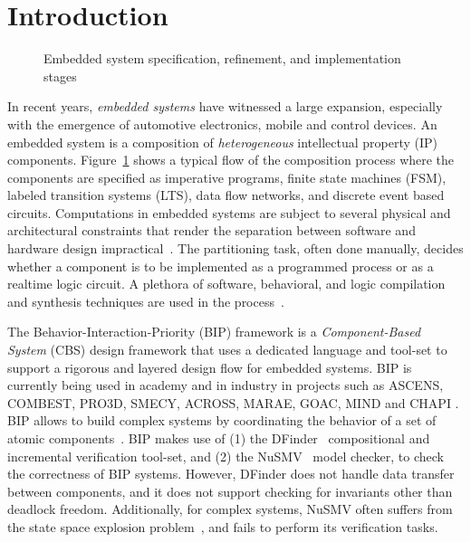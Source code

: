 \section{Introduction}
\label{sect-intro}

\begin{figure}
\resizebox{.9\columnwidth}{!}{
  
}
\caption{Embedded system specification, refinement, and implementation stages}
\label{fig:flow}
\end{figure}

In recent years, {\em embedded systems} have witnessed a large 
expansion, especially with  the emergence of automotive 
electronics, mobile and control devices.
An embedded system is a composition of {\em heterogeneous}
intellectual property (IP) components.
Figure~\ref{fig:flow} shows a typical flow of the composition process where the
components are specified as imperative programs, finite state machines (FSM), labeled 
transition systems (LTS), data flow networks, and discrete event based circuits. 
Computations in embedded systems are subject to several 
physical and architectural 
constraints that render the separation between software and 
hardware design impractical~\cite{henzinger2006embedded}.
The partitioning task, often done manually, decides whether a component is to 
be implemented as a programmed process or as a realtime logic circuit. 
A plethora of software, behavioral, and logic compilation and synthesis techniques are
used in the process~\cite{metropolis2}.


The Behavior-Interaction-Priority (BIP) framework 
is a {\em Component-Based System} (CBS) design framework that uses a dedicated 
language and tool-set to support a rigorous and layered design flow for embedded 
systems. BIP is currently being used in academy and in industry in projects such as ASCENS, COMBEST, PRO3D, SMECY, ACROSS, MARAE, GOAC, MIND and CHAPI \cite{bipwebsite}. 
BIP allows to build complex systems by coordinating the behavior of a set of 
atomic components~\cite{bip11}.
BIP makes use of (1) the DFinder~\cite{dfinder} compositional  
and incremental verification tool-set, and (2) the NuSMV~\cite{nusmv} model checker, 
to check the correctness of BIP systems. 
However, DFinder \cite{BBL14} does not handle data transfer between components, 
and it does not support checking for invariants other than deadlock freedom. 
Additionally, for complex systems, NuSMV often suffers from the state space explosion 
problem~\cite{sipser2006introduction}, and fails to perform its verification tasks.

